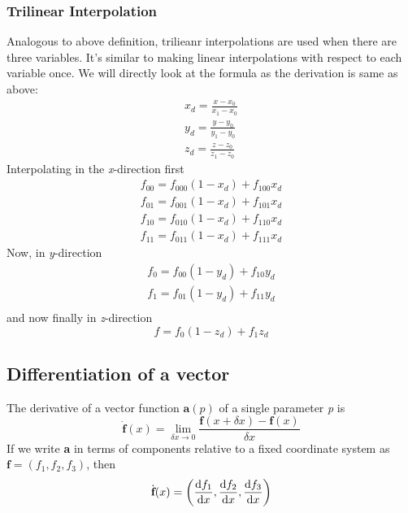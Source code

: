 \subsubsection{Trilinear Interpolation}
Analogous to above definition, trilieanr interpolations are used when there are three variables. It's similar to making linear interpolations with respect to each variable once. We will directly look at the formula as the derivation is same as above:
\begin{equation}
\begin{split}
	x_{d} = \frac{x - x_{0}}{x_{1} - x_{0}} \\
	y_{d} = \frac{y - y_{0}}{y_{1} - y_{0}} \\
	z_{d} = \frac{z - z_{0}}{z_{1} -z_{0}}
\end{split}
\end{equation}
Interpolating in the \textit{x}-direction first
\begin{equation}
\begin{split}
	f_{00}= f_{000}(1 - x_{d}) + f_{100}x_{d} \\
	f_{01}= f_{001}(1 - x_{d}) + f_{101}x_{d}\\
	f_{10}= f_{010}(1 - x_{d}) + f_{110}x_{d}\\
	f_{11}= f_{011}(1 - x_{d}) + f_{111}x_{d}
\end{split}
\end{equation}
Now, in \textit{y}-direction
\begin{equation}
\begin{split}
	f_{0}= f_{00}(1 - y_{d}) + f_{10}y_{d} \\
	f_{1}= f_{01}(1 - y_{d}) + f_{11}y_{d}\\
\end{split}
\end{equation}
and now finally in \textit{z}-direction
\begin{equation}
	f = f_{0} ( 1 - z_{d}) + f_{1}z_{d}
\end{equation}

\subsection{Differentiation of a vector}
The derivative of a vector function $ \textbf{a}(p) $ of a single parameter \textit{p} is
\begin{equation}
	\dot {\textbf{f}} (x) = \lim_{\delta x \rightarrow 0} \frac{\textbf{f}(x + \delta x) - \textbf{f}(x)}{\delta x}
\end{equation}
If we write \textbf{a} in terms of components relative to a fixed coordinate system as $ \textbf{f} = ( f_{1}, f_{2}, f_{3} ) $, then 
\begin{equation}
	\dot{\textbf{f}}(x) = \bigg(\frac{\mathop{}\!\mathrm{d} f_{1}}{\mathop{}\!\mathrm{d} x}, \frac{\mathop{}\!\mathrm{d} f_{2}}{\mathop{}\!\mathrm{d} x}, \frac{\mathop{}\!\mathrm{d} f_{3}}{\mathop{}\!\mathrm{d} x} \bigg )
\end{equation}


